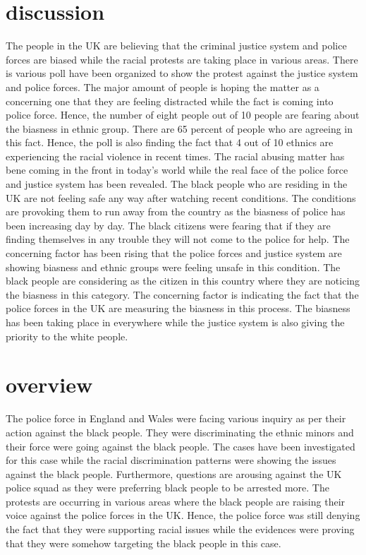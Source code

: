 \documentclass[conference]{IEEEtran}
\begin{document}
\section{discussion}
The people in the UK are believing that the criminal justice system and police forces are biased while the racial protests are taking place in various areas. There is various poll have been organized to show the protest against the justice system and police forces. The major amount of people is hoping the matter as a concerning one that they are feeling distracted while the fact is coming into police force. Hence, the number of eight people out of 10 people are fearing about the biasness in ethnic group.
 There are 65 percent of people who are agreeing in this fact. Hence, the poll is also finding the fact that 4 out of 10 ethnics are experiencing the racial violence in recent times. The racial abusing matter has bene coming in the front in today’s world while the real face of the police force and justice system has been revealed. The black people who are residing in the UK are not feeling safe any way after watching recent conditions. The conditions are provoking them to run away from the country as the biasness of police has been increasing day by day. The black citizens were fearing that if they are finding themselves in any trouble they will not come to the police for help. The concerning factor has been rising that the police forces and justice system are showing biasness and ethnic groups were feeling unsafe in this condition. The black people are considering as the citizen in this country where they are noticing the biasness in this category. The concerning factor is indicating the fact that the police forces in the UK are measuring the biasness in this process. The biasness has been taking place in everywhere while the justice system is also giving the priority to the white people. 
\section{overview}
The police force in England and Wales were facing various inquiry as per their action against the black people. They were discriminating the ethnic minors and their force were going against the black people. The cases have been investigated for this case while the racial discrimination patterns were showing the issues against the black people. Furthermore, questions are arousing against the UK police squad as they were preferring black people to be arrested more. The protests are occurring in various areas where the black people are raising their voice against the police forces in the UK. Hence, the police force was still denying the fact that they were supporting racial issues while the evidences were proving that they were somehow targeting the black people in this case.
\end{document}
